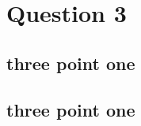\documentclass[12pt]{article}
\begin{document}
\section{Question 3}


\subsection{three point one}


\subsection{three point one}

\end{document}
